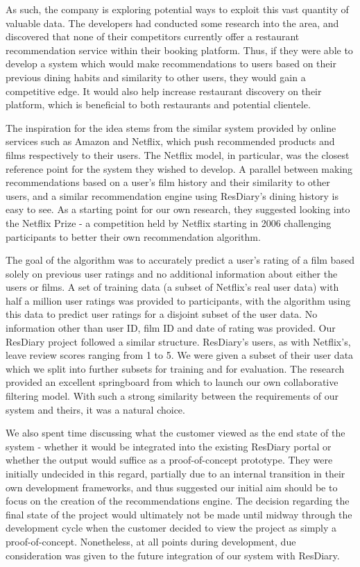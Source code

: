 \documentclass{l3proj}
\begin{document}
As such, the company is exploring potential ways to exploit this vast quantity of valuable data. The developers had conducted some research into the area, and discovered that none of their competitors currently offer a restaurant recommendation service within their booking platform. Thus, if they were able to develop a system which would make recommendations to users based on their previous dining habits and similarity to other users, they would gain a competitive edge. It would also help increase restaurant discovery on their platform, which is beneficial to both restaurants and potential clientele. 

The inspiration for the idea stems from the similar system provided by online services such as Amazon and Netflix, which push recommended products and films respectively to their users. The Netflix model, in particular, was the closest reference point for the system they wished to develop. A parallel between making recommendations based on a user's film history and their similarity to other users, and a similar recommendation engine using ResDiary's dining history is easy to see. As a starting point for our own research, they suggested looking into the Netflix Prize - a competition held by Netflix starting in 2006 challenging participants to better their own recommendation algorithm. \cite{NetflixPrize}

The goal of the algorithm was to accurately predict a user's rating of a film based solely on previous user ratings and no additional information about either the users or films. A set of training data (a subset of Netflix's real user data) with half a million user ratings was provided to participants, with the algorithm using this data to predict user ratings for a disjoint subset of the user data. No information other than user ID, film ID and date of rating was provided. Our ResDiary project followed a similar structure. ResDiary's users, as with Netflix's, leave review scores ranging from 1 to 5. We were given a subset of their user data which we split into further subsets for training and for evaluation. The research provided an excellent springboard from which to launch our own collaborative filtering model. With such a strong similarity between the requirements of our system and theirs, it was a natural choice.


We also spent time discussing what the customer viewed as the end state of the system - whether it would be integrated into the existing ResDiary portal or whether the output would suffice as a proof-of-concept prototype. They were initially undecided in this regard, partially due to an internal transition in their own development frameworks, and thus suggested our initial aim should be to focus on the creation of the recommendations engine. The decision regarding the final state of the project would ultimately not be made until midway through the development cycle when the customer decided to view the project as simply a proof-of-concept. Nonetheless, at all points during development, due consideration was given to the future integration of our system with ResDiary. 
\end{document}
